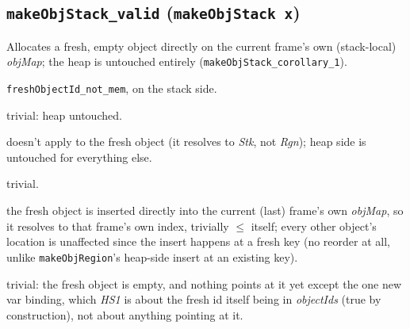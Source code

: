 \documentclass[11pt]{article}
\newcommand{\op}[1]{\texttt{#1}}
\newcommand{\thm}[1]{\textbf{\texttt{#1}}}
\begin{document}
\subsection{\thm{makeObjStack\_valid} (\op{makeObjStack x})}
Allocates a fresh, empty object directly on the current frame's own (stack-local) \textit{objMap};
the heap is untouched entirely (\texttt{makeObjStack\_corollary\_1}).
\begin{description}[nosep]
  \item[L1] \texttt{freshObjectId\_not\_mem}, on the stack side.
  \item[L2, H1, H2] trivial: heap untouched.
  \item[H3] doesn't apply to the fresh object (it resolves to \textit{Stk}, not \textit{Rgn}); heap
    side is untouched for everything else.
  \item[S1] trivial.
  \item[S2, S3] the fresh object is inserted directly into the current (last) frame's own
    \textit{objMap}, so it resolves to that frame's own index, trivially $\le$ itself; every other
    object's location is unaffected since the insert happens at a fresh key (no reorder at all,
    unlike \op{makeObjRegion}'s heap-side insert at an existing key).
  \item[HS1, HS2] trivial: the fresh object is empty, and nothing points at it yet except the one
    new var binding, which \textit{HS1} is about the fresh id itself being in \textit{objectIds}
    (true by construction), not about anything pointing at it.
\end{description}
\end{document}

